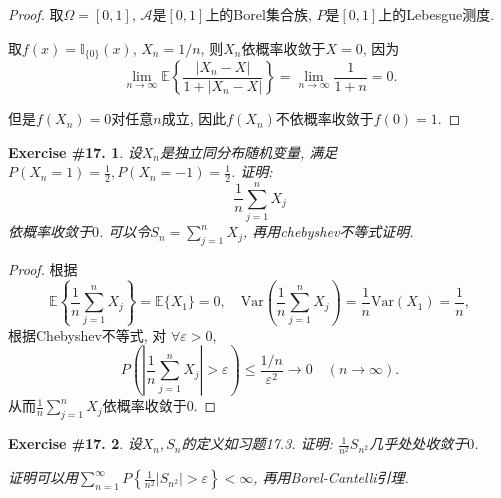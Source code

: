\documentclass[UTF8, a4paper]{article}
\newtheorem{exercise}{Exercise \#17.}
\begin{document}
\begin{proof}
    取\(\Omega = [0, 1]\), \(\mathcal{A}\)是\([0, 1]\)上的Borel集合族, \({P}\)是\([0, 1]\)上的Lebesgue测度.

取\(f(x) = \mathbb{I}_{\{0\}}(x)\), \(X_n = 1/n\), 则\(X_n\)依概率收敛于\(X = 0\), 因为
$$
\lim _{n \rightarrow \infty} \mathbb{E}\left\{\frac{\left|X_n-X\right|}{1+\left|X_n-X\right|}\right\}= \lim_{n\to\infty} \frac{1}{1+n} = 0 .
$$

但是\(f(X_n) = 0\)对任意\(n\)成立, 因此\(f(X_n)\)不依概率收敛于\(f(0) = 1\).
\end{proof}



\begin{framed}
\begin{exercise}
设\(X_n\)是独立同分布随机变量, 满足\(P(X_n = 1) = \frac{1}{2}, P(X_n = -1) = \frac{1}{2}\).
证明:
$$
\frac{1}{n} \sum_{j=1}^n X_j
$$
依概率收敛于\(0\).
可以令\(S_n = \sum_{j=1}^{n}X_j\), 再用chebyshev不等式证明.
\end{exercise}
\end{framed}

\begin{proof}
根据 
$$
\mathbb{E}\left\{\frac{1}{n}\sum_{j=1}^{n}X_j\right\} = \mathbb{E}\{X_1\} = 0, \quad \text{Var}\left(\frac{1}{n}\sum_{j=1}^{n}X_j\right) = \frac{1}{n}\text{Var}(X_1) = \frac{1}{n},
$$
根据Chebyshev不等式, 对
\(\forall \varepsilon > 0\), 
$$
P\left(\left|\frac{1}{n}\sum_{j=1}^{n}X_j\right| > \varepsilon\right) \leq \frac{1/n}{\varepsilon^2} \to 0 \quad (n\to \infty).
$$
从而\(\frac{1}{n}\sum_{j=1}^n X_j\)依概率收敛于\(0\).
\end{proof}



\begin{framed}
\begin{exercise}
设\(X_n, S_n\)的定义如习题17.3. 证明:
\(\frac{1}{n^2}S_{n^2}\)几乎处处收敛于\(0\).

证明可以用\(\sum_{n=1}^{\infty}P\left\{\frac{1}{n^2}|S_{n^2}| > \varepsilon\right\} < \infty\), 再用Borel-Cantelli引理.
\end{exercise}
\end{framed}
\end{document}
